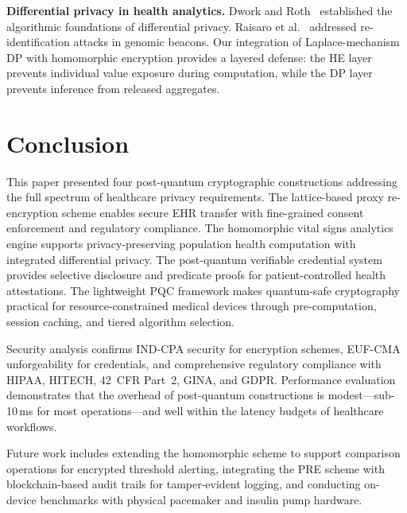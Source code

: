\documentclass[conference,10pt]{IEEEtran}
\begin{document}
\textbf{Differential privacy in health analytics.} Dwork and Roth~\cite{dwork2014dp} established the algorithmic foundations of differential privacy. Raisaro et al.~\cite{raisaro2018dp_genomics} addressed re-identification attacks in genomic beacons. Our integration of Laplace-mechanism DP with homomorphic encryption provides a layered defense: the HE layer prevents individual value exposure during computation, while the DP layer prevents inference from released aggregates.

\section{Conclusion}
\label{sec:conclusion}

This paper presented four post-quantum cryptographic constructions addressing the full spectrum of healthcare privacy requirements. The lattice-based proxy re-encryption scheme enables secure EHR transfer with fine-grained consent enforcement and regulatory compliance. The homomorphic vital signs analytics engine supports privacy-preserving population health computation with integrated differential privacy. The post-quantum verifiable credential system provides selective disclosure and predicate proofs for patient-controlled health attestations. The lightweight PQC framework makes quantum-safe cryptography practical for resource-constrained medical devices through pre-computation, session caching, and tiered algorithm selection.

Security analysis confirms IND-CPA security for encryption schemes, EUF-CMA unforgeability for credentials, and comprehensive regulatory compliance with HIPAA, HITECH, 42~CFR Part~2, GINA, and GDPR. Performance evaluation demonstrates that the overhead of post-quantum constructions is modest---sub-10\,ms for most operations---and well within the latency budgets of healthcare workflows.

Future work includes extending the homomorphic scheme to support comparison operations for encrypted threshold alerting, integrating the PRE scheme with blockchain-based audit trails for tamper-evident logging, and conducting on-device benchmarks with physical pacemaker and insulin pump hardware.

\balance


\end{document}
